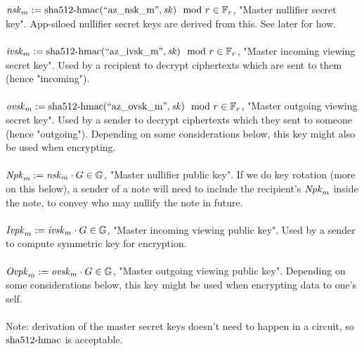 \\
\\
$\nskm := \shahmac(\text{``az\_nsk\_m''}, \sk) \mod r \in \Fr$, "Master nullifier secret key". App-siloed nullifier secret keys are derived from this. See later for how.\\
\\
$\ivskm := \shahmac(\text{``az\_ivsk\_m''}, \sk) \mod r \in \Fr$, "Master incoming viewing secret key". Used by a recipient to decrypt ciphertexts which are sent to them (hence "incoming").\\
\\
$\ovskm := \shahmac(\text{``az\_ovsk\_m''}, \sk) \mod r \in \Fr$, "Master outgoing viewing secret key". Used by a sender to decrypt ciphertexts which they sent to someone (hence "outgoing"). Depending on some considerations below, this key might also be used when encrypting.\\
\\
$\Npkm := \nskm \cdot G \in \G$, "Master nullifier public key". If we do key rotation (more on this below), a sender of a note will need to include the recipient's $\Npkm$ inside the note, to convey who may nullify the note in future.\\
\\
$\Ivpkm := \ivskm \cdot G \in \G$, "Master incoming viewing public key". Used by a sender to compute symmetric key for encryption.\\
\\
$\Ovpkm := \ovskm \cdot G \in \G$, "Master outgoing viewing public key". Depending on some considerations below, this key might be used when encrypting data to one's self.\\
\\
Note: derivation of the master secret keys doesn't need to happen in a circuit, so $\shahmac$ is acceptable.\\
\\




